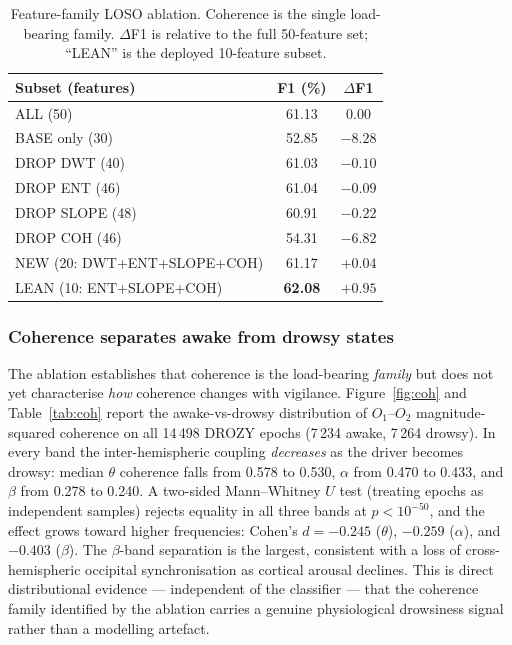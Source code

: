 \documentclass[journal]{IEEEtran}
\begin{document}
\begin{table}[t]
\caption{Feature-family LOSO ablation. Coherence is the single load-bearing family. \(\Delta\)F1 is relative to the full 50-feature set; ``LEAN'' is the deployed 10-feature subset.}
\label{tab:ablation}
\centering
\footnotesize
\setlength{\tabcolsep}{4pt}
\begin{tabular}{l c c}
\toprule
Subset (features) & F1 (\%) & \(\Delta\)F1 \\
\midrule
ALL (50) & 61.13 & 0.00 \\
BASE only (30) & 52.85 & \(-8.28\) \\
DROP DWT (40) & 61.03 & \(-0.10\) \\
DROP ENT (46) & 61.04 & \(-0.09\) \\
DROP SLOPE (48) & 60.91 & \(-0.22\) \\
DROP COH (46) & 54.31 & \(\mathbf{-6.82}\) \\
NEW (20: DWT+ENT+SLOPE+COH) & 61.17 & \(+0.04\) \\
LEAN (10: ENT+SLOPE+COH) & \textbf{62.08} & \(+0.95\) \\
\bottomrule
\end{tabular}
\end{table}

\subsubsection{Coherence separates awake from drowsy states}
\label{sec:coh-stats}
The ablation establishes that coherence is the load-bearing \emph{family} but does not yet characterise \emph{how} coherence changes with vigilance. Figure~\ref{fig:coh} and Table~\ref{tab:coh} report the awake-vs-drowsy distribution of \(O_1\)--\(O_2\) magnitude-squared coherence on all 14\,498 DROZY epochs (7\,234 awake, 7\,264 drowsy). In every band the inter-hemispheric coupling \emph{decreases} as the driver becomes drowsy: median \(\theta\) coherence falls from 0.578 to 0.530, \(\alpha\) from 0.470 to 0.433, and \(\beta\) from 0.278 to 0.240. A two-sided Mann--Whitney \(U\) test (treating epochs as independent samples) rejects equality in all three bands at \(p < 10^{-50}\), and the effect grows toward higher frequencies: Cohen's \(d = -0.245\) (\(\theta\)), \(-0.259\) (\(\alpha\)), and \(-0.403\) (\(\beta\)). The \(\beta\)-band separation is the largest, consistent with a loss of cross-hemispheric occipital synchronisation as cortical arousal declines. This is direct distributional evidence --- independent of the classifier --- that the coherence family identified by the ablation carries a genuine physiological drowsiness signal rather than a modelling artefact.
\end{document}
